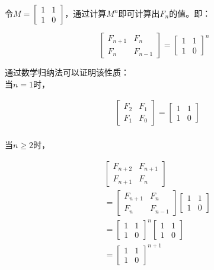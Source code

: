 令$ M = \left[\begin{matrix} 1 & 1\\ 1 & 0\end{matrix} \right] $，通过计算$ M^n $即可计算出$ F_n $的值。即：

$$
	\left[\begin{matrix} F_{n+1} & F_n\\ F_n & F_{n-1} \end{matrix} \right]
	= \left[\begin{matrix} 1 & 1\\ 1 & 0 \end{matrix} \right]^n
$$

通过数学归纳法可以证明该性质：\\

当$ n = 1 $时，

\vspace{-1cm}

\begin{align*}
	 & \left[\begin{matrix} F_2 & F_1\\ F_1 & F_0 \end{matrix} \right]
	= \left[\begin{matrix} 1 & 1\\ 1 & 0 \end{matrix} \right]  \\
\end{align*}

\vspace{-1cm}

当$ n \ge 2 $时，

\vspace{-1cm}

\begin{align*}
	 & \left[\begin{matrix} F_{n+2} & F_{n+1}\\ F_{n+1} & F_n \end{matrix} \right]         \\
	 & = \left[\begin{matrix} F_{n+1} & F_{n}\\ F_{n} & F_{n-1} \end{matrix} \right]
	\left[\begin{matrix} 1 & 1\\ 1 & 0 \end{matrix} \right]            \\
	 & = \left[\begin{matrix} 1 & 1\\ 1 & 0 \end{matrix} \right]^n
	\left[\begin{matrix} 1 & 1\\ 1 & 0 \end{matrix} \right]            \\
	 & = \left[\begin{matrix} 1 & 1\\ 1 & 0 \end{matrix} \right]^{n+1}
\end{align*}

